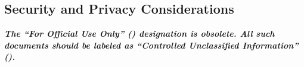 
\subsection{Security and Privacy Considerations}
\label{loc:DocOverview_CUI}

{\bf \em The ``For Official Use Only'' (\FOUO) designation is obsolete.
All such documents should be labeled as ``Controlled Unclassified Information'' (\CUI).}


